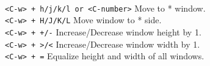\documentclass[10pt,landscape]{article}
\makeatletter
\renewcommand{\section}{\@startsection{section}{1}{0mm}%
                                {-1ex plus -.5ex minus -.2ex}%
                                {0.5ex plus .2ex}%
                                {\normalfont\large\bfseries}}
\makeatother
\begin{document}
\begin{multicols}{3}
\verb! !\\
\verb!<C-w> + h/j/k/l or <C-number>! \hfill Move to * window.\\
\verb!<C-w> + H/J/K/L! \hfill Move window to * side.\\                                   
\verb!<C-w> + +/-! \hfill Increase/Decrease window height by 1.\\      
\verb!<C-w> + >/<!  \hfill Increase/Decrease window width by 1.\\                      
\verb!<C-w> + =!  \hfill Equalize height and width of all windows.\\
\verb! !\\



\end{multicols}
\end{document}
